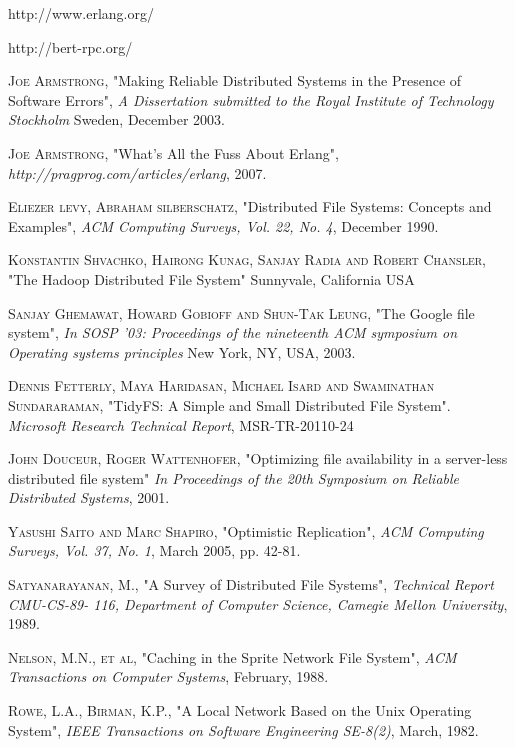\documentclass[a4paper,12pt]{article}
\begin{document}
\begin{thebibliography}{99}
  http://www.erlang.org/

  http://bert-rpc.org/

  \textsc{Joe Armstrong},
  "Making Reliable Distributed Systems in the Presence of Software Errors",
  \emph{A Dissertation submitted to the Royal Institute of Technology Stockholm}
  Sweden, December 2003.

  \textsc{Joe Armstrong},
  "What's All the Fuss About Erlang",
  \emph{http://pragprog.com/articles/erlang},
  2007.

  \textsc{Eliezer levy, Abraham silberschatz},
  "Distributed File Systems: Concepts and Examples",
  \emph{ACM Computing Surveys, Vol. 22, No. 4},
  December 1990.

  \textsc{Konstantin Shvachko, Hairong Kunag, Sanjay Radia and Robert Chansler},
  "The Hadoop Distributed File System"
  Sunnyvale, California USA

  \textsc{Sanjay Ghemawat, Howard Gobioff and Shun-Tak Leung},
  "The Google file system",
  \emph{In SOSP '03: Proceedings of the nineteenth ACM symposium on Operating systems principles}
  New York, NY, USA, 2003.

  \textsc{Dennis Fetterly, Maya Haridasan, Michael Isard and Swaminathan Sundararaman},
  "TidyFS: A Simple and Small Distributed File System".
  \emph{Microsoft Research Technical Report},
  MSR-TR-20110-24



  \textsc{John Douceur, Roger Wattenhofer},
  "Optimizing file availability in a server-less distributed file system"
  \emph{In Proceedings of the 20th Symposium on Reliable Distributed Systems},
  2001.

  \textsc{Yasushi Saito and Marc Shapiro},
  "Optimistic Replication",
  \emph{ACM Computing Surveys, Vol. 37, No. 1},
  March 2005, pp. 42-81.

  \textsc{Satyanarayanan, M.},
  "A Survey of Distributed File Systems",
  \emph{Technical Report CMU-CS-89- 116, Department of Computer Science, Camegie Mellon University},
  1989.

  \textsc{Nelson, M.N., et al},
  "Caching in the Sprite Network File System",
  \emph{ACM Transactions on Computer Systems},
  February, 1988.

  \textsc{Rowe, L.A., Birman, K.P.},
  "A Local Network Based on the Unix Operating System",
  \emph{IEEE Transactions on Software Engineering SE-8(2)},
  March, 1982.


\end{thebibliography}
\end{document}
